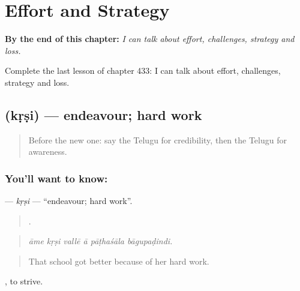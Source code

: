 
\chapter{Effort and Strategy}
\label{ch:te-effort-and-strategy}

\begin{chapteropening}
\textbf{By the end of this chapter:} \emph{I can talk about effort, challenges, strategy and loss.}

Complete the last lesson of chapter 433: I can talk about effort, challenges, strategy and loss.
\end{chapteropening}

\section[\texorpdfstring{\te{కృషి} (kṛṣi)}{కృషి (kṛṣi)}]{ (kṛṣi) — endeavour; hard work}

\label{lesson:TE-C433-krsi}



\begin{quote}
Before the new one: say the Telugu for credibility, then the Telugu for awareness.
\end{quote}

\subsection*{You'll want to know: }
\textbf{} — \emph{kṛṣi} — \textquotedblleft{}endeavour; hard work\textquotedblright{}.

\begin{quote}
     .
\end{quote}

\begin{quote}
\emph{āme kṛṣi vallē ā pāṭhaśāla bāgupaḍindi.}
\end{quote}

\begin{quote}
That school got better because of her hard work.
\end{quote}

 , to strive.

